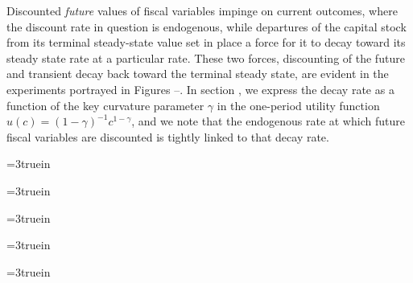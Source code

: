 Discounted {\it future\/}  values of fiscal variables impinge on current outcomes, where the
 discount rate in question is endogenous, while departures of the capital stock from its terminal
 steady-state value set in place a force for it to decay toward its
steady state rate at a particular rate.
 These two forces, discounting of the future and transient decay back toward the terminal steady
 state, are evident in the experiments portrayed in Figures --.
 In section ,
  we express the decay rate as a function of the key curvature parameter
 $\gamma$ in the one-period utility function $u(c)=(1-\gamma)^{-1}c^{1-\gamma}$, and we note that
 the endogenous rate at which future fiscal variables are discounted is tightly linked to that decay
 rate.

\newpage

\centerline{\epsfxsize=3truein}
\caption{Response to foreseen once-and-for-all increase in $g$ at $t=10$.
From left to right, top to bottom: $k, c, \bar R, \eta, g$. The dashed line is the original
steady state.}
\endfigure


\centerline{\epsfxsize=3truein}
\caption{Response to foreseen once-and-for-all increase in $g$ at $t=10$.
From left to right, top to bottom: $k, c, \bar R, \eta, g$. The dashed lines show the original
steady state. The solid lines  are for $\gamma=2$, while the dashed-dotted lines are for $\gamma=.2$}
\endfigure


\centerline{\epsfxsize=3truein}
\caption{Response to foreseen once-and-for-all increase in $g$ at $t=10$.
From left to right, top to bottom: $c, q, r_{t,t+1}$ and yield curves $r_{t, t+s}$  for $t=0$ (solid line),
$t=10$ (dash-dotted line) and $t=60$ (dashed line); term to maturity $s$ is on the $x$ axis for the yield curve, time $t$
for the other panels.}
\endfigure
%
\centerline{\epsfxsize=3truein}
\caption{Response to foreseen once-and-for-all  increase in $\tau_c$ at
$t=10$. From left to right, top to bottom: $k, c, \bar R, \eta, \tau_c$.}
\endfigure



\centerline{\epsfxsize=3truein}
\caption{Response to foreseen increase in $\tau_k$ at $t=10$.  From left to
right, top to bottom: $k, c, \bar R, \eta, \tau_k$. The solid lines depict equilibrium outcomes when $\gamma=2$,
the dashed-dotted lines when $\gamma = .2$.  }
\endfigure


